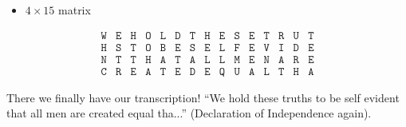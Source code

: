 {\begin{enumerate}
\begin{itemize}
\begin{center}
\[\begin{array}{cccccccccccccccccccc}
                                    \texttt{H} & \texttt{E} & \texttt{R} & \texttt{T} & \texttt{O} & \texttt{L} & \texttt{T} & \texttt{T} & \texttt{S} & \texttt{H} & \texttt{E} & \texttt{L} & \texttt{F} & \texttt{E} & \texttt{A} & \texttt{N} & \texttt{I} & \texttt{U} & \texttt{H} & \texttt{E} \\

                                    \texttt{N} & \texttt{S} & \texttt{H} & \texttt{E} & \texttt{H} & \texttt{B} & \texttt{D} & \texttt{E} & \texttt{A} & \texttt{E} & \texttt{E} & \texttt{Q} & \texttt{M} & \texttt{E} & \texttt{T} & \texttt{L} & \texttt{A} & \texttt{D} & \texttt{T} & \texttt{A}
                                \end{array}
                            \]
                            \vspace*{-1cm}
                        \end{center}
                        There are no words here.
                  \item \(4 \times 15\) matrix
              \end{itemize}
              \begin{center}
                  \vspace*{-1cm}
                  \[
                      \begin{array}{ccccccccccccccc}
                          \texttt{W} & \texttt{E} & \texttt{H} & \texttt{O} & \texttt{L} & \texttt{D} & \texttt{T} & \texttt{H} & \texttt{E} & \texttt{S} & \texttt{E} & \texttt{T} & \texttt{R} & \texttt{U} & \texttt{T} \\

                          \texttt{H} & \texttt{S} & \texttt{T} & \texttt{O} & \texttt{B} & \texttt{E} & \texttt{S} & \texttt{E} & \texttt{L} & \texttt{F} & \texttt{E} & \texttt{V} & \texttt{I} & \texttt{D} & \texttt{E} \\

                          \texttt{N} & \texttt{T} & \texttt{T} & \texttt{H} & \texttt{A} & \texttt{T} & \texttt{A} & \texttt{L} & \texttt{L} & \texttt{M} & \texttt{E} & \texttt{N} & \texttt{A} & \texttt{R} & \texttt{E} \\

                          \texttt{C} & \texttt{R} & \texttt{E} & \texttt{A} & \texttt{T} & \texttt{E} & \texttt{D} & \texttt{E} & \texttt{Q} & \texttt{U} & \texttt{A} & \texttt{L} & \texttt{T} & \texttt{H} & \texttt{A}
                      \end{array}
                  \]
                  \vspace*{-1cm}
              \end{center}
              There we finally have our transcription! ``We hold these truths to be self evident that all men are created equal tha...'' (Declaration of Independence again).
    \end{enumerate}
}

